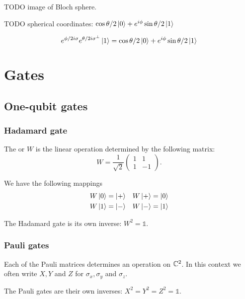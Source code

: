 TODO image of Bloch sphere.

TODO spherical coordinates: $\cos\theta / 2\left| 0 \right\rangle + e^{i\phi}\sin\theta/2 \left| 1 \right\rangle$
\begin{lemma}
\[ e^{\phi/2 i\sigma}e^{\theta/2 i\sigma^\perp}\left| 1 \right\rangle = \cos\theta / 2\left| 0 \right\rangle + e^{i\phi}\sin\theta/2 \left| 1 \right\rangle \]
\end{lemma}

\section{Gates}
\subsection{One-qubit gates}
\subsubsection{Hadamard gate}
\begin{definition}
The  or  $W$ is the linear operation determined by the following matrix:
\[ W = \frac{1}{\sqrt{2}}\begin{pmatrix}
1 & 1 \\ 1 & -1
\end{pmatrix}. \]
\end{definition}
We have the following mappings
\begin{align*}
W\left| 0 \right\rangle &= \left| + \right\rangle & W\left| + \right\rangle &= \left| 0 \right\rangle \\
W\left| 1 \right\rangle &= \left| - \right\rangle & W\left| - \right\rangle &= \left| 1 \right\rangle
\end{align*}

\begin{lemma}
The Hadamard gate is its own inverse: $W^2 = \mathbb{1}$.
\end{lemma}

\subsubsection{Pauli gates}
\begin{definition}
Each of the Pauli matrices determines an operation on $\mathbb{C}^2$. In this context we often write $X,Y$ and $Z$ for $\sigma_x, \sigma_y$ and $\sigma_z$.
\end{definition}

\begin{lemma}
The Pauli gates are their own inverses: $X^2 = Y^2 = Z^2 = \mathbb{1}$.
\end{lemma}




